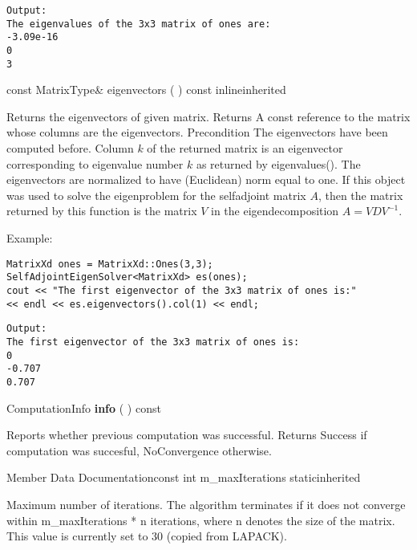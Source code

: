 \begin{verbatim}
Output:
The eigenvalues of the 3x3 matrix of ones are:
-3.09e-16
0
3
\end{verbatim}


\vspace{0.3cm}
const MatrixType\& eigenvectors  ( )  const 
inlineinherited  

Returns the eigenvectors of given matrix. 
Returns
A const reference to the matrix whose columns are the eigenvectors.
Precondition
The eigenvectors have been computed before.
Column $k$ of the returned matrix is an eigenvector corresponding to eigenvalue number $k$ as returned by eigenvalues(). The eigenvectors are normalized to have (Euclidean) norm equal to one. If this object was used to solve the eigenproblem for the selfadjoint matrix $A$, then the matrix returned by this function is the matrix $V$ in the eigendecomposition $A=V D V^{-1}$.


Example:
\begin{lstlisting}
MatrixXd ones = MatrixXd::Ones(3,3);
SelfAdjointEigenSolver<MatrixXd> es(ones);
cout << "The first eigenvector of the 3x3 matrix of ones is:"
<< endl << es.eigenvectors().col(1) << endl;
\end{lstlisting}

\begin{verbatim}		
Output:
The first eigenvector of the 3x3 matrix of ones is:
0
-0.707
0.707
\end{verbatim}


\vspace{0.3cm}
ComputationInfo \textbf{info}  ( )  const 

Reports whether previous computation was successful. 
Returns
Success if computation was succesful, NoConvergence otherwise. 



\vspace{0.3cm}
Member Data Documentationconst int m\_maxIterations 
staticinherited  

Maximum number of iterations. 
The algorithm terminates if it does not converge within m\_maxIterations * n iterations, where n denotes the size of the matrix. This value is currently set to 30 (copied from LAPACK). 







